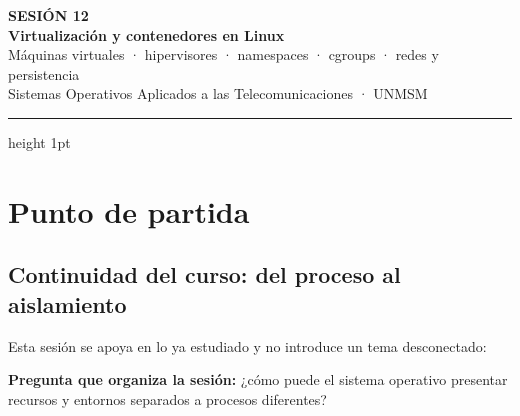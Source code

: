 \documentclass[11pt,a4paper]{article}
\begin{document}
\begin{center}
  {\color{tealx}\bfseries\footnotesize SESIÓN 12}\\[4pt]
  {\color{azulprof}\LARGE\bfseries Virtualización y contenedores en Linux}\\[6pt]
  {\color{azulmedio}\small Máquinas virtuales · hipervisores · namespaces · cgroups · redes y persistencia}\\[3pt]
  {\color{azulmedio}\footnotesize Sistemas Operativos Aplicados a las Telecomunicaciones · UNMSM}
\end{center}
\vspace{0.4em}
{\color{grislinea}\hrule height 1pt}
\vspace{1.2em}

\section{Punto de partida}

\subsection*{Continuidad del curso: del proceso al aislamiento}

Esta sesión se apoya en lo ya estudiado y no introduce un tema desconectado:

\begin{center}
\end{center}

\begin{clave}
\textbf{Pregunta que organiza la sesión:} ¿cómo puede el sistema operativo presentar
recursos y entornos separados a procesos diferentes?
\end{clave}
\end{document}
